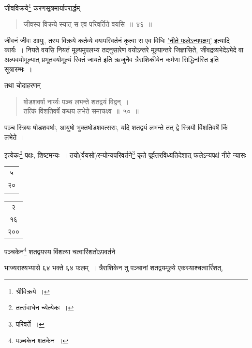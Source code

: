 \documentclass[10pt, openany]{book}
\begin{document}
{{{जीवविक्रये\renewcommand{\thefootnote}{\s ५}\footnote{\s श्रीविक्रये~।} करणसूत्रमार्यापरार्द्धम्\textemdash}

 \label{46}
\begin{quote}
    
{\bs जीवस्य विक्रये स्यात् स एव परिवर्तिते वयसि~॥~४६~॥}\end{quote}

{जीवनं जीवः आयुः, तस्य विक्रये कर्तव्ये वयःपरिवर्तनं कृत्वा स एव विधिः
\hyperref[45]{'नीते फलेऽन्यपक्षम्'} इत्यादि कार्यः~। नियते वयसि नियतं मूल्यमुपलभ्य तदनुसारेण
वयोऽन्तरे मूल्यान्तरे जिज्ञासिते, जीवद्रव्यभेदेऽभेदे वा अल्पवयोमूल्यात्
प्रभूतवयोमूल्यं रिक्तं जायते इति}
{ऋजुनैव त्रैराशिकीयेन कर्मणा सिद्धिर्नास्ति इति सूत्रारम्भः~।}
\vspace{3mm}

{तथा चोदाहरणम्\textemdash}

\begin{quote}
{\eg षोडशवर्षा नार्य्यः पञ्च लभन्ते शतद्वयं विद्वन्~। \\
 तत्किं विंशतिवर्षे कथय लभेते समाचक्ष्व~॥~५०~॥}\end{quote}

{पञ्च स्त्रियः षोडशवर्षाः, आयुषो भुक्तषोडशवत्सराः, यदि शतद्वयं लभन्ते
तत् द्वे स्त्रियौ विंशतिवर्षे किं लभेते~।}

{इत्येकः\renewcommand{\thefootnote}{\s ८}\footnote{\s तत्संवाधेन च्येत्येकः~।}  पक्षः, शिष्टमन्यः~। तयो(र्वयसो)रन्योन्यपरिवर्तने\renewcommand{\thefootnote}{\s ९}\footnote{\s *परिवर्ते~।}  कृते
पूर्वतरविध्यतिदेशात् फलेऽन्यपक्षं नीते न्यासः\textendash \begin{tabular}{c}५  \\२० \\ \\ \end{tabular}\begin{tabular}{|c}२\\१६ \\ २००\end{tabular}पञ्चकेन\renewcommand{\thefootnote}{\s १०}\footnote{\s पञ्चकेन शतकेन~।} शतद्वयस्य विंशत्या
चत्वारिंशतोऽपवर्तने}
{भाज्यराश्यभ्यासे ६४ भक्ते ६४ फलम्~। त्रैराशिकेन तु
पञ्चानां शतद्वयमूल्ये एकस्याश्चत्वारिंंशत्,}

\newpage

}}
\end{document}
